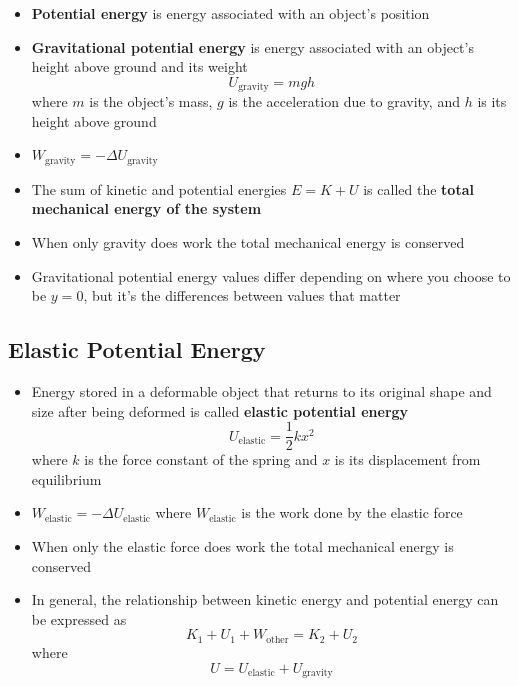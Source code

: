 \documentclass{article}
\begin{document}
\begin{itemize}
    \item \textbf{Potential energy} is energy associated with an object's position

    \item \textbf{Gravitational potential energy} is energy associated with an object's height above ground and its weight \[U_\textrm{gravity}=mgh\] where $m$ is the object's mass, $g$ is the acceleration due to gravity, and $h$ is its height above ground

    \item $W_\textrm{gravity}=-\Delta U_\textrm{gravity}$

    \item The sum of kinetic and potential energies $E=K+U$ is called the \textbf{total mechanical energy of the system}

    \item When only gravity does work the total mechanical energy is conserved

    \item Gravitational potential energy values differ depending on where you choose to be $y=0$, but it's the differences between values that matter
\end{itemize}

\subsection{Elastic Potential Energy}

\begin{itemize}
    \item Energy stored in a deformable object that returns to its original shape and size after being deformed is called \textbf{elastic potential energy} \[U_\textrm{elastic}=\frac{1}{2}kx^2\] where $k$ is the force constant of the spring and $x$ is its displacement from equilibrium

    \item $W_\textrm{elastic}=-\Delta U_\textrm{elastic}$ where $W_\textrm{elastic}$ is the work done by the elastic force

    \item When only the elastic force does work the total mechanical energy is conserved

    \item In general, the relationship between kinetic energy and potential energy can be expressed as \[K_1+U_1+W_\textrm{other}=K_2+U_2\] where \[U=U_\textrm{elastic}+U_\textrm{gravity}\]
\end{itemize}
\end{document}
